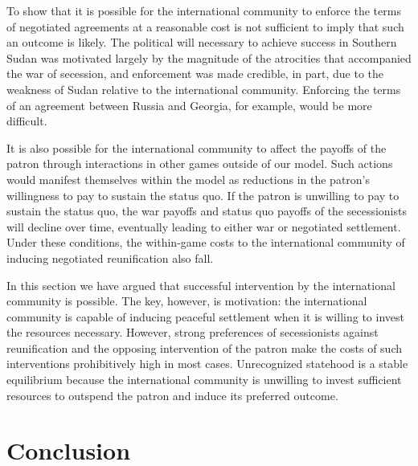 \documentclass[12pt,letterpaper, notitlepage]{article}
\begin{document}
To show that it is possible for the international community to enforce the terms of negotiated agreements at a reasonable cost is not sufficient to imply that such an outcome is likely. The political will necessary to achieve success in Southern Sudan was motivated largely by the magnitude of the atrocities that accompanied the war of secession, and enforcement was made credible, in part, due to the weakness of Sudan relative to the international community. Enforcing the terms of an agreement between Russia and Georgia, for example, would be more difficult.

It is also possible for the international community to affect the payoffs of the patron through interactions in other games outside of our model. Such actions would manifest themselves within the model as reductions in the patron's willingness to pay to sustain the status quo. If the patron is unwilling to pay to sustain the status quo, the war payoffs and status quo payoffs of the secessionists will decline over time, eventually leading to either war or negotiated settlement. Under these conditions, the within-game costs to the international community of inducing negotiated reunification also fall.

In this section we have argued that successful intervention by the international community is possible. The key, however, is motivation: the international community is capable of inducing peaceful settlement when it is willing to invest the resources necessary. However, strong preferences of secessionists against reunification and the opposing intervention of the patron make the costs of such interventions prohibitively high in most cases.  Unrecognized statehood is a stable equilibrium because the international community is unwilling to invest sufficient resources to outspend the patron and induce its preferred outcome.


\section*{Conclusion}
\end{document}
